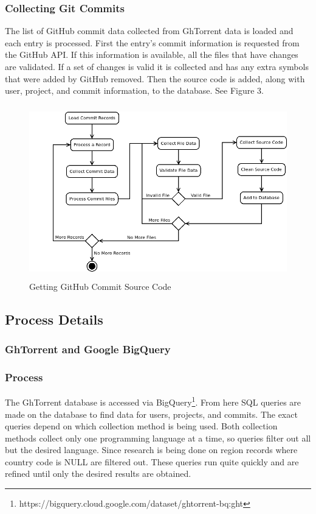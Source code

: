 \documentclass{article}
\begin{document}
\subsubsection*{Collecting Git Commits}
The list of GitHub commit data collected from GhTorrent data is loaded and each entry is processed. First the entry's commit information is requested from the GitHub API. If this information is available, all the files that have changes are validated. If a set of changes is valid it is collected and has any extra symbols that were added by GitHub removed. Then the source code is added, along with user, project, and commit information, to the database.  See Figure 3.

\begin{figure}[t]
    \centering
    \includegraphics[height=7.5cm]{diagrams/commits.png}
    \caption{Getting GitHub Commit Source Code}
\end{figure}


\subsection{Process Details}

\subsubsection{GhTorrent and Google BigQuery}

\subsubsection*{Process}
The GhTorrent database is accessed via BigQuery\footnote{https://bigquery.cloud.google.com/dataset/ghtorrent-bq:ght}. From here SQL queries are made on the database to find data for users, projects, and commits. The exact queries depend on which collection method is being used. Both collection methods collect only one programming language at a time, so queries filter out all but the desired language. Since research is being done on region records where country code is NULL are filtered out. These queries run quite quickly and are refined until only the desired results are obtained.
\end{document}
